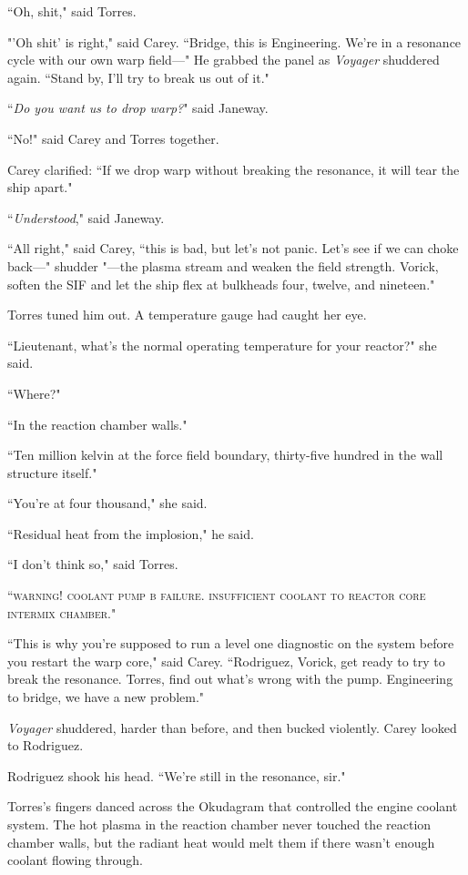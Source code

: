 \documentclass[twoside,letterpaper,12pt]{memoir}
\begin{document}
``Oh, shit," said Torres.

"'Oh shit' is right," said Carey. ``Bridge, this is Engineering. We're in a resonance cycle with our own warp field---" He grabbed the panel as \textit{Voyager} shuddered again. ``Stand by, I'll try to break us out of it."

``\textit{Do you want us to drop warp?}" said Janeway.

``No!" said Carey and Torres together.

Carey clarified: ``If we drop warp without breaking the resonance, it will tear the ship apart."

``\textit{Understood}," said Janeway.

``All right," said Carey, ``this is bad, but let's not panic. Let's see if we can choke back---" shudder "---the plasma stream and weaken the field strength. Vorick, soften the SIF and let the ship flex at bulkheads four, twelve, and nineteen."

Torres tuned him out. A temperature gauge had caught her eye.

``Lieutenant, what's the normal operating temperature for your reactor?" she said.

``Where?"

``In the reaction chamber walls."

``Ten million kelvin at the force field boundary, thirty-five hundred in the wall structure itself."

``You're at four thousand," she said.

``Residual heat from the implosion," he said.

``I don't think so," said Torres.

``\textsc{warning! coolant pump b failure. insufficient coolant to reactor core intermix chamber}."

``This is why you're supposed to run a level one diagnostic on the system before you restart the warp core," said Carey. ``Rodriguez, Vorick, get ready to try to break the resonance. Torres, find out what's wrong with the pump. Engineering to bridge, we have a new problem."

\textit{Voyager} shuddered, harder than before, and then bucked violently. Carey looked to Rodriguez.

Rodriguez shook his head. ``We're still in the resonance, sir."

Torres's fingers danced across the Okudagram that controlled the engine coolant system. The hot plasma in the reaction chamber never touched the reaction chamber walls, but the radiant heat would melt them if there wasn't enough coolant flowing through.
\end{document}
